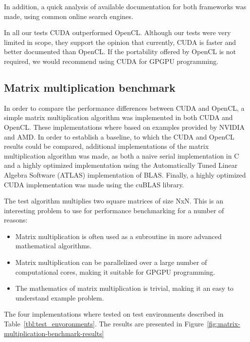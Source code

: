 In addition, a quick analysis of available documentation for both frameworks was made, using common online search engines.

In all our tests CUDA outperformed OpenCL\@. Although our tests were very limited in scope, they support the opinion that currently, CUDA is faster and better documented than OpenCL\@. If the portability offered by OpenCL is not required, we would recommend using CUDA for GPGPU programming.

\subsection{Matrix multiplication benchmark} %
\label{sub:matrix_multiplication_benchmark}
In order to compare the performance differences between CUDA and OpenCL, a simple matrix multiplication algorithm was implemented in both CUDA and OpenCL\@. These implementations where based on examples provided by NVIDIA and AMD\@. In order to establish a baseline, to which the CUDA and OpenCL results could be compared, additional implementations of the matrix multiplication algorithm was made, as both a naive serial implementation in C and a highly optimized implementation using the Automatically Tuned Linear Algebra Software (ATLAS\cite{atlas}) implementation of BLAS\@. Finally, a highly optimized CUDA implementation was made using the cuBLAS\cite{cublas} library.

The test algorithm multiplies two square matrices of size NxN. This is an interesting problem to use for performance benchmarking for a number of reasons:

\begin{itemize}
    \item Matrix multiplication is often used as a subroutine in more advanced mathematical algorithms.
    \item Matrix multiplication can be parallelized over a large number of computational cores, making it suitable for GPGPU programming.
    \item The mathematics of matrix multiplication is trivial, making it an easy to understand example problem.
\end{itemize}

The four implementations where tested on test environments described in Table~\ref{tbl:test_envoronments}. The results are presented in Figure~\ref{fig:matrix-multiplication-benchmark-results}

